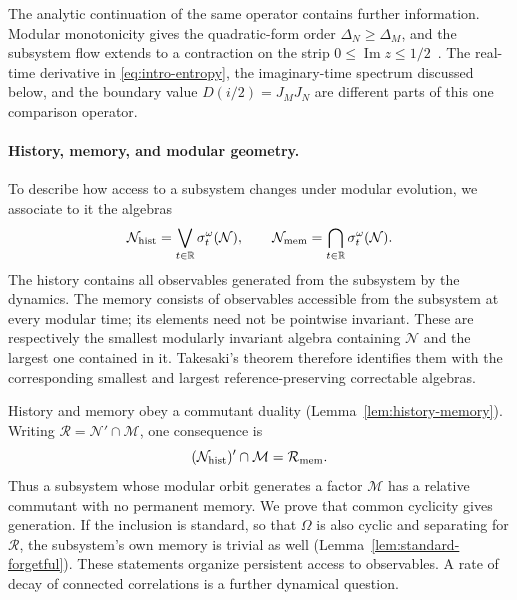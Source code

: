 \documentclass[a4paper,11pt]{article}
\theoremstyle{definition}
\begin{document}
The analytic continuation of the same operator contains further information. Modular monotonicity gives the quadratic-form order $\Delta_N\ge\Delta_M$, and the subsystem flow extends to a contraction on the strip $0\le\operatorname{Im}z\le1/2$~\cite{revolutionizing}. The real-time derivative in \eqref{eq:intro-entropy}, the imaginary-time spectrum discussed below, and the boundary value $D(i/2)=J_MJ_N$ are different parts of this one comparison operator.

\paragraph{History, memory, and modular geometry.}
To describe how access to a subsystem changes under modular evolution, we associate to it the algebras
\begin{equation}
 \mathcal N_{\rm hist}=\bigvee_{t\in\mathbb R}\sigma_t^\omega(\mathcal N),
 \qquad
 \mathcal N_{\rm mem}=\bigcap_{t\in\mathbb R}\sigma_t^\omega(\mathcal N).
\end{equation}
The history contains all observables generated from the subsystem by the dynamics. The memory consists of observables accessible from the subsystem at every modular time; its elements need not be pointwise invariant. These are respectively the smallest modularly invariant algebra containing $\mathcal N$ and the largest one contained in it. Takesaki's theorem therefore identifies them with the corresponding smallest and largest reference-preserving correctable algebras.

History and memory obey a commutant duality (Lemma~\ref{lem:history-memory}). Writing $\mathcal R=\mathcal N'\cap\mathcal M$, one consequence is
\begin{equation}
 (\mathcal N_{\rm hist})'\cap\mathcal M=\mathcal R_{\rm mem}.
\end{equation}
Thus a subsystem whose modular orbit generates a factor $\mathcal M$ has a relative commutant with no permanent memory. We prove that common cyclicity gives generation. If the inclusion is standard, so that $\Omega$ is also cyclic and separating for $\mathcal R$, the subsystem's own memory is trivial as well (Lemma~\ref{lem:standard-forgetful}). These statements organize persistent access to observables. A rate of decay of connected correlations is a further dynamical question.
\end{document}
